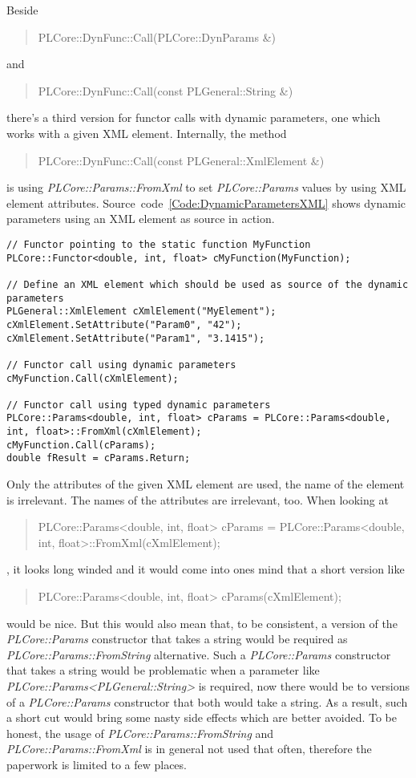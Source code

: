 Beside \begin{quote}PLCore::DynFunc::Call(PLCore::DynParams \&)\end{quote} and \begin{quote}PLCore::DynFunc::Call(const PLGeneral::String \&)\end{quote} there's a third version for functor calls with dynamic parameters, one which works with a given XML element. Internally, the method \begin{quote}PLCore::DynFunc::Call(const PLGeneral::XmlElement \&)\end{quote} is using \emph{PLCore::Params::FromXml} to set \emph{PLCore::Params} values by using XML element attributes. Source~code~\ref{Code:DynamicParametersXML} shows dynamic parameters using an XML element as source in action.
\begin{lstlisting}[label=Code:DynamicParametersXML,caption={Dynamic parameters using an XML element as source}]
// Functor pointing to the static function MyFunction
PLCore::Functor<double, int, float> cMyFunction(MyFunction);

// Define an XML element which should be used as source of the dynamic parameters
PLGeneral::XmlElement cXmlElement("MyElement");
cXmlElement.SetAttribute("Param0", "42");
cXmlElement.SetAttribute("Param1", "3.1415");

// Functor call using dynamic parameters
cMyFunction.Call(cXmlElement);

// Functor call using typed dynamic parameters
PLCore::Params<double, int, float> cParams = PLCore::Params<double, int, float>::FromXml(cXmlElement);
cMyFunction.Call(cParams);
double fResult = cParams.Return;
\end{lstlisting}
Only the attributes of the given XML element are used, the name of the element is irrelevant. The names of the attributes are irrelevant, too. When looking at \begin{quote}PLCore::Params<double, int, float> cParams = PLCore::Params<double, int, float>::FromXml(cXmlElement);\end{quote}, it looks long winded and it would come into ones mind that a short version like \begin{quote}PLCore::Params<double, int, float> cParams(cXmlElement);\end{quote} would be nice. But this would also mean that, to be consistent, a version of the \emph{PLCore::Params} constructor that takes a string would be required as \emph{PLCore::Params::FromString} alternative. Such a \emph{PLCore::Params} constructor that takes a string would be problematic when a parameter like \emph{PLCore::Params<PLGeneral::String>} is required, now there would be to versions of a \emph{PLCore::Params} constructor that both would take a string. As a result, such a short cut would bring some nasty side effects which are better avoided. To be honest, the usage of \emph{PLCore::Params::FromString} and \emph{PLCore::Params::FromXml} is in general not used that often, therefore the paperwork is limited to a few places.




